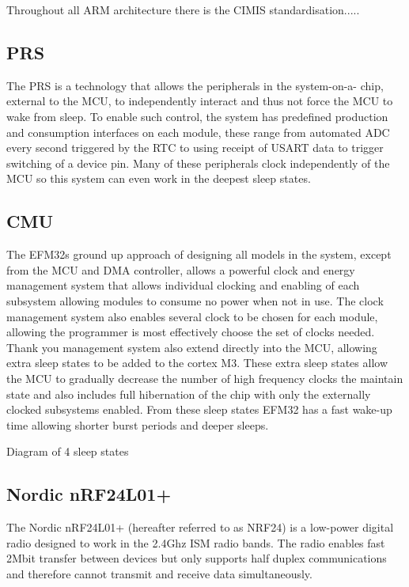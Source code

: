 Throughout all ARM architecture there is the CIMIS standardisation.....

\cite{Sadasivan 2006} \cite{Arm2012, EnergyMicro2011}


\subsection{\acf{PRS}}
The \ac{PRS} is a technology that allows the peripherals in the system-on-a-
chip, external to the \ac{MCU}, to independently interact and thus not force the \ac{MCU} to wake from
sleep. To enable such control, the system has predefined production and consumption interfaces on
each module, these range from automated ADC every second triggered by the \ac{RTC} to using receipt
of \ac{USART} data to trigger switching of a device pin. Many of these peripherals clock independently of
the \ac{MCU} so this system can even work in the deepest sleep states.

\subsection{CMU}
The EFM32s ground up approach of designing all models in the system, except from the \ac{MCU} and \ac{DMA} controller,
allows a powerful clock and energy management system that allows individual clocking and enabling
of each subsystem allowing modules to consume no power when not in use. The clock management
system also enables several clock to be chosen for each module, allowing the programmer is most
effectively choose the set of clocks needed. Thank you management system also extend directly into
the \ac{MCU}, allowing extra sleep states to be added to the cortex M3. These extra sleep states allow
the \ac{MCU} to gradually decrease the number of high frequency clocks the maintain state and
also includes full hibernation of the chip with only the externally clocked subsystems
enabled. From these sleep states EFM32 has a fast wake-up time allowing shorter burst
periods and deeper sleeps.

{Diagram of 4 sleep states}

\subsection{Nordic nRF24L01+}
The Nordic nRF24L01+ (hereafter referred to as NRF24) is a low-power digital radio
designed to work in the 2.4Ghz ISM radio bands. The radio enables fast 2Mbit transfer
between devices but only supports half duplex communications and therefore cannot transmit and
receive data simultaneously.

